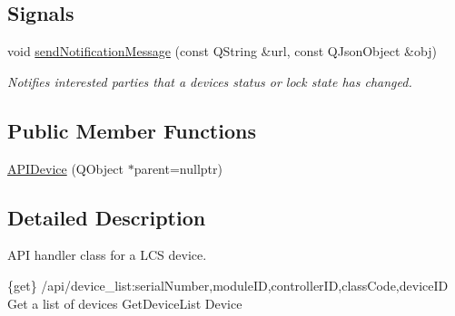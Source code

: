 \subsection*{Signals}
\begin{DoxyCompactItemize}
\item 
\mbox{\label{class_a_p_i_device_a1096381146a1c545b194d4bb63b32b8b}} 
void \hyperlink{class_a_p_i_device_a1096381146a1c545b194d4bb63b32b8b}{send\+Notification\+Message} (const Q\+String \&url, const Q\+Json\+Object \&obj)
\begin{DoxyCompactList}\small\item\em Notifies interested parties that a device\textquotesingle{}s status or lock state has changed. \end{DoxyCompactList}\end{DoxyCompactItemize}
\subsection*{Public Member Functions}
\begin{DoxyCompactItemize}
\item 
\hyperlink{class_a_p_i_device_ab983034826edbff2b4246002b22081a5}{A\+P\+I\+Device} (Q\+Object $\ast$parent=nullptr)
\end{DoxyCompactItemize}


\subsection{Detailed Description}
A\+PI handler class for a L\+CS device. 

\{get\} /api/device\+\_\+list\+:serial\+Number,module\+ID,controller\+ID,class\+Code,device\+ID Get a list of devices  Get\+Device\+List  Device

